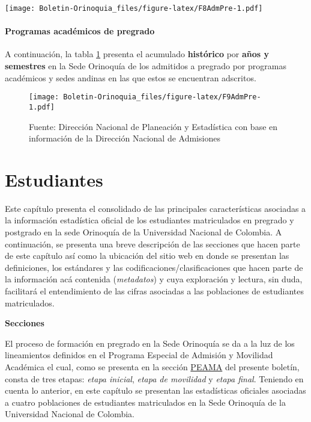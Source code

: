 \documentclass[
]{book}
\begin{document}
\texttt{[image: Boletin-Orinoquia\_files/figure-latex/F8AdmPre-1.pdf]}

\hypertarget{programas-acaduxe9micos-de-pregrado}{%
\subsubsection{Programas académicos de pregrado}\label{programas-acaduxe9micos-de-pregrado}}

A continuación, la tabla \ref{fig:F9AdmPre} presenta el acumulado \textbf{histórico} por \textbf{años y semestres} en la Sede Orinoquía de los admitidos a pregrado por programas académicos y sedes andinas en las que estos se encuentran adscritos.

\begin{figure}
\centering
\texttt{[image: Boletin-Orinoquia\_files/figure-latex/F9AdmPre-1.pdf]}
\caption{\label{fig:F9AdmPre}Fuente: Dirección Nacional de Planeación y Estadística con base en información de la Dirección Nacional de Admisiones}
\end{figure}

\hypertarget{Estudiantes}{%
\chapter{Estudiantes}\label{Estudiantes}}

Este capítulo presenta el consolidado de las principales características asociadas a la información estadística oficial de los estudiantes matriculados en pregrado y postgrado en la sede Orinoquía de la Universidad Nacional de Colombia. A continuación, se presenta una breve descripción de las secciones que hacen parte de este capítulo así como la ubicación del sitio web en donde se presentan las definiciones, los estándares y las codificaciones/clasificaciones que hacen parte de la información acá contenida (\emph{metadatos}) y cuya exploración y lectura, sin duda, facilitará el entendimiento de las cifras asociadas a las poblaciones de estudiantes matriculados.

\textbf{Secciones}

El proceso de formación en pregrado en la Sede Orinoquía se da a la luz de los lineamientos definidos en el Programa Especial de Admisión y Movilidad Académica el cual, como se presenta en la sección \protect\hyperlink{peama}{PEAMA} del presente boletín, consta de tres etapas: \emph{etapa inicial}, \emph{etapa de movilidad} y \emph{etapa final}. Teniendo en cuenta lo anterior, en este capítulo se presentan las estadísticas oficiales asociadas a cuatro poblaciones de estudiantes matriculados en la Sede Orinoquía de la Universidad Nacional de Colombia.
\end{document}
